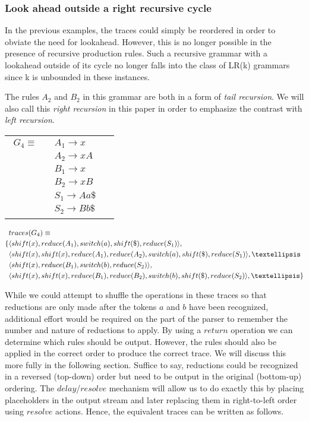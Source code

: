 \documentclass[envcountsame,runningheads]{llncs}
\begin{document}
\subsubsection{Look ahead outside a right recursive cycle}
In the previous examples, the traces could simply be reordered in order to obviate the need for lookahead. However, this is no longer possible in the presence of recursive production rules.
Such a recursive grammar with a lookahead outside of its cycle no longer falls into the class of LR(k) grammars since k is unbounded in these instances.

The rules $A_2$ and $B_2$ in this grammar are both in a form of \emph{tail recursion}. 
We will also call this \emph{right recursion} in this paper in order to emphasize the contrast with \emph{left recursion}.

\begin{tabular}[t]{cl}
\parbox{.3\textwidth}{
\begin{align*}
G_4 \equiv \quad & A_1 \rightarrow x\\
                 & A_2 \rightarrow x A\\
                 & B_1 \rightarrow x\\
                 & B_2 \rightarrow x B\\
                 & S_1 \rightarrow A a \$\\
                 & S_2 \rightarrow B b \$
\end{align*}}
\parbox{.6\textwidth}{}
\end{tabular}

{\small\parbox{.3\textwidth}{\begin{align*}
&traces(G_4) \equiv \\
\{ & \langle shift(x), reduce(A_1), switch(a), shift(\$), reduce(S_1) \rangle,\\
   & \langle shift(x), shift(x), reduce(A_1), reduce(A_2), switch(a), shift(\$), reduce(S_1) \rangle, \textellipsis \\
   & \langle shift(x), reduce(B_1), switch(b), reduce(S_2) \rangle,\\
   & \langle shift(x), shift(x), reduce(B_1), reduce(B_2), switch(b), shift(\$), reduce(S_2) \rangle, \textellipsis \}
\end{align*}}}

While we could attempt to shuffle the operations in these traces so that reductions are only made after the tokens $a$ and $b$ have been recognized, 
additional effort would be required on the part of the parser to remember the number and nature of reductions to apply. 
By using a $return$ operation we can determine which rules should be output. However, the rules should also be applied in the correct order to produce the correct trace. 
We will discuss this more fully in the following section.
Suffice to say, reductions could be recognized in a reversed (top-down) order but need to be output in the original (bottom-up) ordering.
The $delay$/$resolve$ mechanism will allow us to do exactly this by placing placeholders in the output stream and later replacing them in right-to-left order using $resolve$ actions.
Hence, the equivalent traces can be written as follows.
\end{document}
